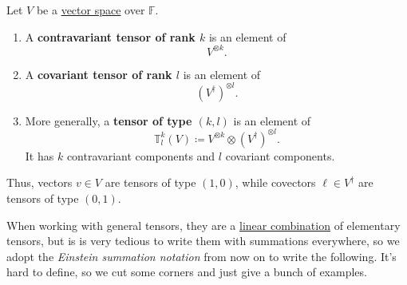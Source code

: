 	\begin{definition}
	  \label{def:covariant-contravariant-tensors}
		Let $V$ be a \hyperref[def:vector-space]{vector space} over $\mathbb{F}$.

		\begin{enumerate}
			\item A \textbf{contravariant tensor of rank $k$} is an element of
				\begin{equation}
					V^{\otimes k}.
				\end{equation}

			\item A \textbf{covariant tensor of rank $l$} is an element of
				\begin{equation}
					(V^\dagger)^{\otimes l}.
				\end{equation}

			\item More generally, a \textbf{tensor of type $(k,l)$} is an element of
				\begin{equation}
					\mathbb{T}^k_l(V) \coloneqq V^{\otimes k}\otimes (V^\dagger)^{\otimes l}.
				\end{equation}
				It has $k$ contravariant components and $l$ covariant components.
		\end{enumerate}

		Thus, vectors $v\in V$ are tensors of type $(1,0)$, while covectors $\ell\in V^\dagger$ are tensors of type $(0,1)$.
	\end{definition}

	When working with general tensors, they are a \hyperref[def:linear-combination]{linear combination} of elementary tensors, but is is very tedious to write them with summations everywhere, so we adopt the \textit{Einstein summation notation} from now on to write the following. It's hard to define, so we cut some corners and just give a bunch of examples. 


